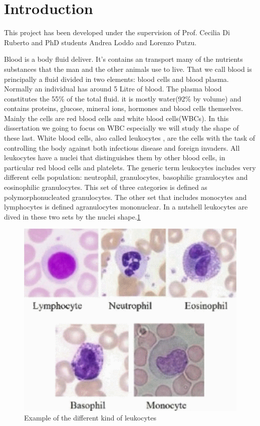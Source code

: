 
\chapter*{Introduction}
This project has been developed under the supervision of Prof. Cecilia Di Ruberto and PhD students Andrea Loddo and Lorenzo Putzu.

\bigskip


Blood is a body fluid deliver. It's contains an transport many of the nutrients substances that the man and the other animals use to live. That we call blood is principally a fluid divided in two elements: blood cells and blood plasma. Normally an individual has around 5 Litre of blood. The plasma blood constitutes the 55\% of the total fluid. it is mostly water(92\% by volume) and contains proteins, glucose, mineral ions, hormones and blood cells themselves.\cite{website:wiki} Mainly the cells are red blood cells and white blood cells(WBCs). In this dissertation we going to focus on WBC especially we will study the shape of these last.
White blood cells, also called leukocytes , are the cells with the task of controlling the body against both infectious disease and foreign invaders. All leukocytes have a nuclei that distinguishes them by other blood cells, in particular red blood cells and platelets. The generic term leukocytes includes very different cells population: neutrophil, granulocytes, basophilic granulocytes and eosinophilic granulocytes. This set of three categories is defined as   polymorphonucleated granulocytes. The other set that includes monocytes and lymphocytes is defined agranulocytes mononuclear. In a nutshell leukocytes are dived in these two sets by the nuclei shape.\ref{fig:kindLeuko}
\begin{figure}
	\begin{center}
		\centering
		\includegraphics[scale=0.5]{img/leuko.png}
		\caption{Example of the different kind of leukocytes\cite{ann17}}
		\label{fig:kindLeuko}
	\end{center}
\end{figure}

